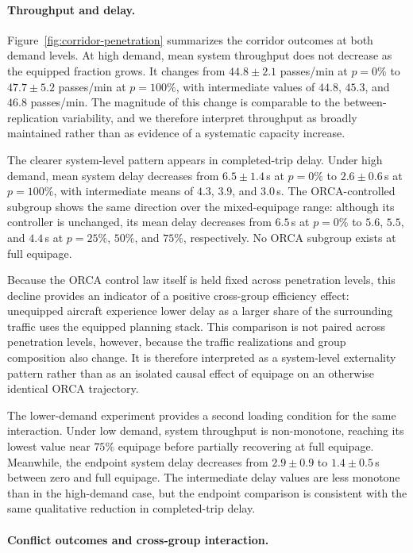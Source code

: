 \documentclass[11pt]{article}
\theoremstyle{plain}
\theoremstyle{definition}
\begin{document}
\paragraph{Throughput and delay.}

Figure~\ref{fig:corridor-penetration} summarizes the corridor
outcomes at both demand levels. At high demand, mean system throughput
does not decrease as the equipped fraction grows. It changes from
$44.8\pm2.1$ passes/min at $p=0\%$ to
$47.7\pm5.2$ passes/min at $p=100\%$, with intermediate values of
$44.8$, $45.3$, and $46.8$ passes/min. The magnitude of this change
is comparable to the between-replication variability, and we
therefore interpret throughput as broadly maintained rather than as
evidence of a systematic capacity increase.

The clearer system-level pattern appears in completed-trip delay.
Under high demand, mean system delay decreases from
$6.5\pm1.4$\,s at $p=0\%$ to $2.6\pm0.6$\,s at
$p=100\%$, with intermediate means of $4.3$, $3.9$, and
$3.0$\,s. The ORCA-controlled subgroup shows the same direction over
the mixed-equipage range: although its controller is unchanged, its
mean delay decreases from $6.5$\,s at $p=0\%$ to
$5.6$, $5.5$, and $4.4$\,s at $p=25\%$, $50\%$, and
$75\%$, respectively. No ORCA subgroup exists at full equipage.

Because the ORCA control law itself is held fixed across penetration
levels, this decline provides an indicator of a positive cross-group
efficiency effect: unequipped aircraft experience lower delay as a
larger share of the surrounding traffic uses the equipped planning
stack. This comparison is not paired across penetration levels,
however, because the traffic realizations and group composition also
change. It is therefore interpreted as a system-level externality
pattern rather than as an isolated causal effect of equipage on an
otherwise identical ORCA trajectory.

The lower-demand experiment provides a second loading condition for
the same interaction. Under low demand, system throughput is
non-monotone, reaching its lowest value near $75\%$ equipage before
partially recovering at full equipage. Meanwhile, the endpoint system
delay decreases from $2.9\pm0.9$ to $1.4\pm0.5$\,s between zero
and full equipage. The intermediate delay values are less monotone
than in the high-demand case, but the endpoint comparison is
consistent with the same qualitative reduction in completed-trip
delay.

\paragraph{Conflict outcomes and cross-group interaction.}
\end{document}
